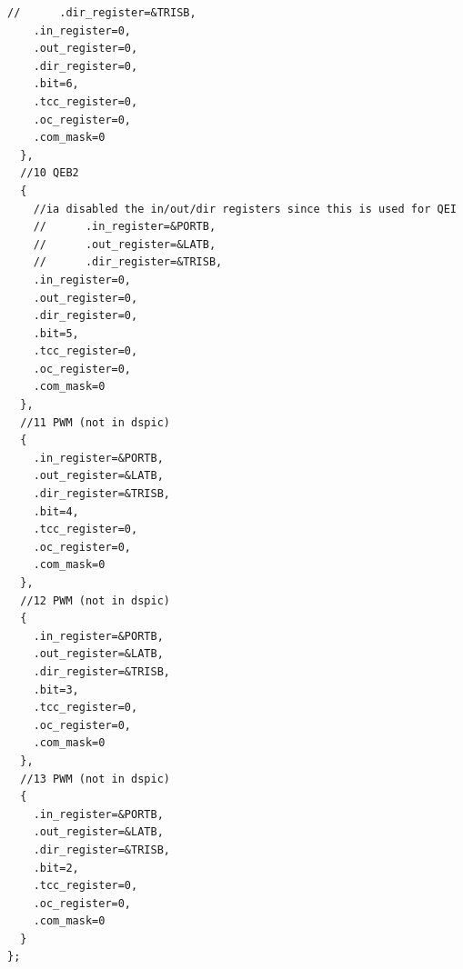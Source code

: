 \documentclass[10pt,a4paper, notitlepage]{report}
\begin{document}
\begin{lstlisting}[style=CStyle]
    //      .dir_register=&TRISB,
    .in_register=0,
    .out_register=0,
    .dir_register=0,
    .bit=6,
    .tcc_register=0,
    .oc_register=0,
    .com_mask=0
  },
  //10 QEB2
  {
    //ia disabled the in/out/dir registers since this is used for QEI
    //      .in_register=&PORTB,
    //      .out_register=&LATB,
    //      .dir_register=&TRISB,
    .in_register=0,
    .out_register=0,
    .dir_register=0,
    .bit=5,
    .tcc_register=0,
    .oc_register=0,
    .com_mask=0
  },
  //11 PWM (not in dspic)
  {
    .in_register=&PORTB,
    .out_register=&LATB,
    .dir_register=&TRISB,
    .bit=4,
    .tcc_register=0,
    .oc_register=0,
    .com_mask=0
  },
  //12 PWM (not in dspic)
  {
    .in_register=&PORTB,
    .out_register=&LATB,
    .dir_register=&TRISB,
    .bit=3,
    .tcc_register=0,
    .oc_register=0,
    .com_mask=0
  },
  //13 PWM (not in dspic)
  {
    .in_register=&PORTB,
    .out_register=&LATB,
    .dir_register=&TRISB,
    .bit=2,
    .tcc_register=0,
    .oc_register=0,
    .com_mask=0
  }
};

\end{lstlisting}
\end{document}
